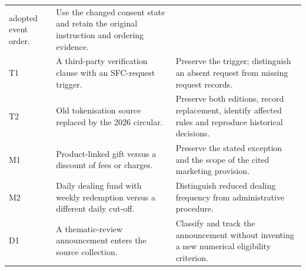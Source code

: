 \documentclass[12pt,a4paper,oneside,openany]{book}
\begin{document}
\begin{longtable}{P{0.09\textwidth}P{0.41\textwidth}P{0.4\textwidth}}
adopted event order. & Use the changed consent state and retain the original
instruction and ordering evidence.\\
T1 & A third-party verification clause with an SFC-request trigger. & Preserve the
trigger; distinguish an absent request from missing request records.\\
T2 & Old tokenisation source replaced by the 2026 circular. & Preserve both editions,
record replacement, identify affected rules and reproduce historical decisions.\\
M1 & Product-linked gift versus a discount of fees or charges. & Preserve the stated
exception and the scope of the cited marketing provision.\\
M2 & Daily dealing fund with weekly redemption versus a different daily cut-off. &
Distinguish reduced dealing frequency from administrative procedure.\\
D1 & A thematic-review announcement enters the source collection. & Classify and
track the announcement without inventing a new numerical eligibility criterion.\\
\bottomrule
\end{longtable}
\endgroup
\end{document}
